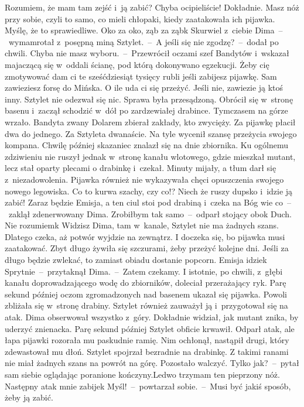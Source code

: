 \documentclass[../MAIN.tex]{subfiles}
\begin{document}
\xx Rozumiem, że mam tam zejść i~ją zabić? Chyba ocipieliście!
\xx Dokładnie. Masz nóż przy sobie, czyli to samo, co mieli chłopaki, kiedy zaatakowała ich pijawka. Myślę, że to sprawiedliwe. Oko za oko, ząb za ząb\3k
\xx Skurwiel z~ciebie Dima~--~wymamrotał z~posępną miną Sztylet.~--~A jeśli się nie zgodzę?~--~dodał po chwili.
\xx Chyba nie masz wyboru.~--~Przewrócił oczami szef Bandytów i~wskazał majaczącą się w~oddali ścianę, pod którą dokonywano egzekucji. \xx Żeby cię zmotywować dam ci te sześćdziesiąt tysięcy rubli jeśli zabijesz pijawkę. Sam zawieziesz forsę do Mińska. O ile uda ci się przeżyć. Jeśli nie, zawiezie ją ktoś inny.
\qm
Sztylet nie odezwał się nic. Sprawa była przesądzoną. Obrócił się w~stronę basenu i~zaczął schodzić w~dół po zardzewiałej drabince. Tymczasem na górze wrzało. Bandyta zwany Dolarem zbierał zakłady, kto zwycięży. Za pijawkę płacił dwa do jednego. Za Sztyleta dwanaście. Na tyle wycenił szansę przeżycia swojego kompana. Chwilę później skazaniec znalazł się na dnie zbiornika. Ku ogólnemu zdziwieniu nie ruszył jednak w~stronę kanału wlotowego, gdzie mieszkał mutant, lecz stał oparty plecami o drabinkę i~czekał. Minuty mijały, a tłum darł się z~niezadowolenia. Pijawka również nie wykazywała chęci opuszczenia swojego nowego legowiska.
\sx
Co to kurwa szachy, czy co!? Niech że ruszy dupsko i~idzie ją zabić! Zaraz będzie Emisja, a ten ciul stoi pod drabiną i~czeka na Bóg wie co~--~zaklął zdenerwowany Dima.
\xx Zrobiłbym tak samo~--~odparł stojący obok Duch.
\xx Nie rozumiem\3k
\xx Widzisz Dima, tam w~kanale, Sztylet nie ma żadnych szans. Dlatego czeka, aż potwór wyjdzie na zewnątrz. I doczeka się, bo pijawka musi zaatakować. Zbyt długo żywiła się szczurami, żeby przeżyć kolejne dni. Jeśli za długo będzie zwlekać, to zamiast obiadu dostanie popcorn. Emisja idzie\3k
\xx Sprytnie~--~przytaknął Dima.~--~Zatem czekamy.
\qm
I istotnie, po chwili, z~głębi kanału doprowadzającego wodę do zbiorników, doleciał przerażający ryk. Parę sekund później oczom zgromadzonych nad basenem ukazał się pijawka. Powoli zbliżała się w~stronę drabiny. Sztylet również zauważył ją i~przygotował się na atak. Dima obserwował wszystko z~góry. Dokładnie widział, jak mutant znika, by uderzyć znienacka. Parę sekund później Sztylet obficie krwawił. Odparł atak, ale łapa pijawki rozorała mu paskudnie ramię. Nim ochłonął, nastąpił drugi, który zdewastował mu dłoń. Sztylet spojrzał bezradnie na drabinkę. Z takimi ranami nie miał żadnych szans na powrót na górę. Pozostało walczyć.
\sx
Tylko jak?~--~pytał sam siebie oglądając poranione kończyny.\x Ledwo trzymam ten pieprzony nóż. Następny atak mnie zabije\3k Myśl!~--~powtarzał sobie.~--~Musi być jakiś sposób, żeby ją zabić.
\end{document}
